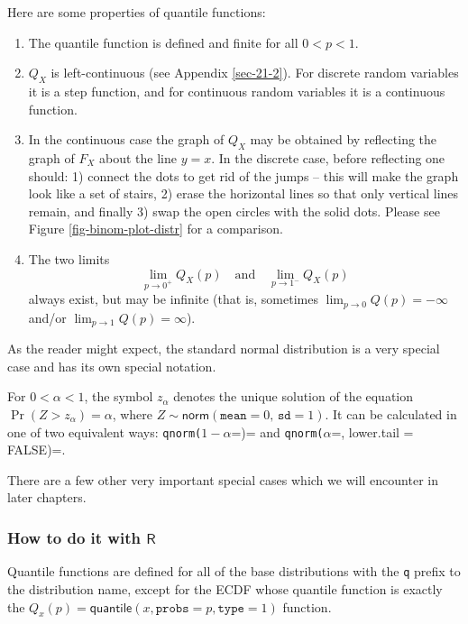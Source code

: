 \documentclass[captions=tableheading]{scrbook}
\begin{document}
\begin{rem}
Here are some properties of quantile functions:
\begin{enumerate}
\item The quantile function is defined and finite for all \(0<p<1\).
\item \(Q_{X}\) is left-continuous (see Appendix \ref{sec-21-2}). For discrete random variables it is a step function, and for continuous random variables it is a continuous function.
\item In the continuous case the graph of \(Q_{X}\) may be obtained by reflecting the graph of \(F_{X}\) about the line \(y=x\). In the discrete case, before reflecting one should: 1) connect the dots to get rid of the jumps -- this will make the graph look like a set of stairs, 2) erase the horizontal lines so that only vertical lines remain, and finally 3) swap the open circles with the solid dots. Please see Figure \ref{fig-binom-plot-distr} for a comparison.
\item The two limits
   \[
   \lim_{p\to0^{+}}Q_{X}(p)\quad\mbox{and}\quad\lim_{p\to1^{-}}Q_{X}(p)
   \]
   always exist, but may be infinite (that is, sometimes \(\lim_{p\to0}Q(p)=-\infty\) and/or \(\lim_{p\to1}Q(p)=\infty\)).
\end{enumerate}

\end{rem}

As the reader might expect, the standard normal distribution is a very special case and has its own special notation.

\begin{defn}
For \(0<\alpha<1\), the symbol \(z_{\alpha}\) denotes the unique solution of the equation \(\Pr(Z>z_{\alpha})=\alpha\), where \(Z\sim\mathsf{norm}(\mathtt{mean}=0,\,\mathtt{sd}=1)\). It can be calculated in one of two equivalent ways: \texttt{qnorm(}\(1-\alpha\)=)= and \texttt{qnorm(}\(\alpha\)=, lower.tail = FALSE)=. 
\end{defn}

There are a few other very important special cases which we will encounter in later chapters. 
\subsubsection{How to do it with \(\mathsf{R}\)}
\label{sec-6-3-1-1}


Quantile functions are defined for all of the base distributions with the \texttt{q} prefix to the distribution name, except for the ECDF whose quantile function is exactly the \( Q_{x}(p) = \mathsf{quantile}(x, \mathtt{probs} = p, \mathtt{type} = 1) \) function. 
\end{document}

